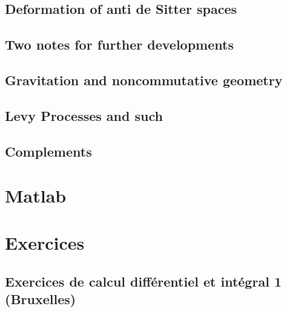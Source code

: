 \chapter{Deformation of anti de Sitter spaces}   \label{ChDefoBH}


\chapter{Two notes for further developments}        \label{ChapNoteDev}



\chapter{Gravitation and noncommutative geometry}


\chapter{Levy Processes and such}


\chapter{Complements}









\emptyInputPath
{}

\part{Matlab}




\emptyInputPath
{}
\part{Exercices} 





\chapter{Exercices de calcul différentiel et intégral 1 (Bruxelles)}


 
